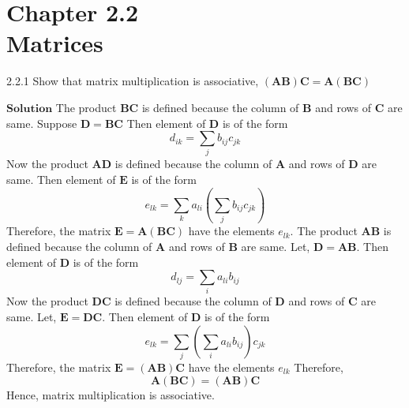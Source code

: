 \documentclass{styles/kaobook}
\begin{document}

\mainmatter %




\chapter*{Chapter 2.2 \\ Matrices}

\begin{greenbox}{2.2.1}
Show that matrix multiplication is associative, $(\mathbf{A}\mathbf{B}) \mathbf{C}=\mathbf{A}(\mathbf{B}\mathbf{C})$
\end{greenbox}


$\boxed{\textbf{Solution}}$ The product $\mathbf{BC}$ is defined because the column of $\mathbf{B}$ and rows of $\mathbf{C}$ are same.
Suppose $\mathbf{D}=\mathbf{BC}$
Then element of $\mathbf{D}$ is of the form
$$d_{ik}=\sum_{j} b_{ij} c_{j k}$$
Now the product $\mathbf{AD}$ is defined because the column of $\mathbf{A}$ and rows of $\mathbf{D}$ are same. Then element of $\mathbf{E}$ is of the form
$$e_{l k}=\sum_{k} a_{l i}\left(\sum_{j} b_{i j} c_{j k}\right)$$
Therefore, the matrix $\mathbf{E}=\mathbf{A}(\mathbf{B} \mathbf{C})$ have the elements $e_{lk}$. The product $\mathbf{AB}$ is defined because the column of $\mathbf{A}$ and rows of $\mathbf{B}$ are same. Let, $\mathbf{D}=\mathbf{AB}$. Then element of $\mathbf{D}$ is of the form
$$d_{l j}=\sum_{i} a_{li} b_{i j}$$
Now the product $\mathbf{D C}$ is defined because the column of $\mathbf{D}$ and rows of $\mathbf{C}$ are same. Let, $\mathbf{E}=\mathbf{D C}$. Then element of $\mathbf{D}$ is of the form
$$e_{lk}=\sum_{j}\left(\sum_{i} a_{li} b_{i j}\right) c_{j k}$$
Therefore, the matrix $\mathbf{E}=(\mathbf{A} \mathbf{B}) \mathbf{C}$ have the elements $e_{lk}$
Therefore,
$$\mathbf{A}(\mathbf{B} \mathbf{C})=(\mathbf{A} \mathbf{B}) \mathbf{C}$$
Hence, matrix multiplication is associative.
\end{document}
